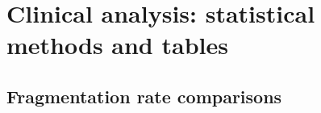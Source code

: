 \documentclass[runningheads]{llncs}
\begin{document}




\section{Clinical analysis: statistical methods and tables}
\label{sec:supp_clinical_tables}

\subsection{Fragmentation rate comparisons}
\end{document}
